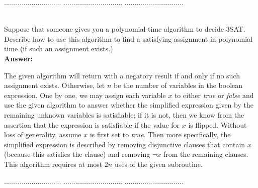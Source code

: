 \documentclass[a4paper,11pt]{article}
\begin{document}
\pagebreak

 $.............................$
 $..............................$
          $..............................$\\

\bigskip

\\
Suppose that someone gives you a polynomial-time algorithm to decide 3SAT. 
Describe how to use this algorithm to find a satisfying assignment in
polynomial time (if such an assignment exists.) \\
{\bf Answer:} \par
The given algorithm will return with a negatory result if and only if no such assignment exists. Otherwise, let $n$ be the number of variables in the boolean expression. One by one, we may assign each variable $x$ to either \textit{true} or \textit{false} and use the given algorithm to answer whether the simplified expression given by the remaining unknown variables is satisfiable; if it is not, then we know from the assertion that the expression is satisfiable if the value for $x$ is flipped. Without loss of generality, assume $x$ is first set to \textit{true}. Then more specifically, the simplified expression is described by removing disjunctive clauses that contain $x$ (because this satisfies the clause) and removing $\neg x$ from the remaining clauses. This algorithm requires at most $2n$ uses of the given subroutine.


\pagebreak

 $.............................$
 $..............................$
          $..............................$\\

\bigskip
\end{document}
